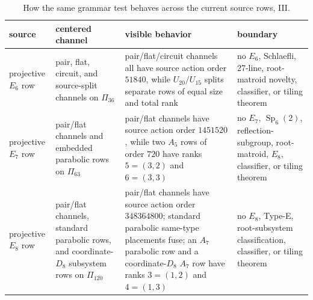 \begin{table}[!htbp]
\centering
\scriptsize
\setlength{\tabcolsep}{3pt}
\renewcommand{\arraystretch}{0.86}
\caption{How the same grammar test behaves across the current source rows, III.}
\begin{tabular}{@{}L{0.16\textwidth}L{0.24\textwidth}L{0.28\textwidth}L{0.24\textwidth}@{}}
\toprule
source & centered channel & visible behavior & boundary \\
\midrule
projective \(E_6\) row & pair, flat, circuit, and source-split channels on \(\Pi_{36}\) & pair/flat/circuit channels all have source action order \(51840\), while \(U_{20}/U_{15}\) splits separate rows of equal size and total rank & no \(E_6\), Schlaefli, 27-line, root-matroid novelty, classifier, or tiling theorem \\
projective \(E_7\) row & pair/flat channels and embedded parabolic rows on \(\Pi_{63}\) & pair/flat channels have source action order \(1451520\), while two \(A_5\) rows of order \(720\) have ranks \(5=(3,2)\) and \(6=(3,3)\) & no \(E_7\), \(\operatorname{Sp}_6(2)\), reflection-subgroup, root-matroid, \(E_8\), classifier, or tiling theorem \\
projective \(E_8\) row & pair/flat channels, standard parabolic rows, and coordinate-\(D_8\) subsystem rows on \(\Pi_{120}\) & pair/flat channels have source action order \(348364800\); standard parabolic same-type placements fuse; an \(A_7\) parabolic row and a coordinate-\(D_8\) \(A_7\) row have ranks \(3=(1,2)\) and \(4=(1,3)\) & no \(E_8\), Type-E, root-subsystem classification, classifier, or tiling theorem \\
\bottomrule
\end{tabular}
\end{table}

